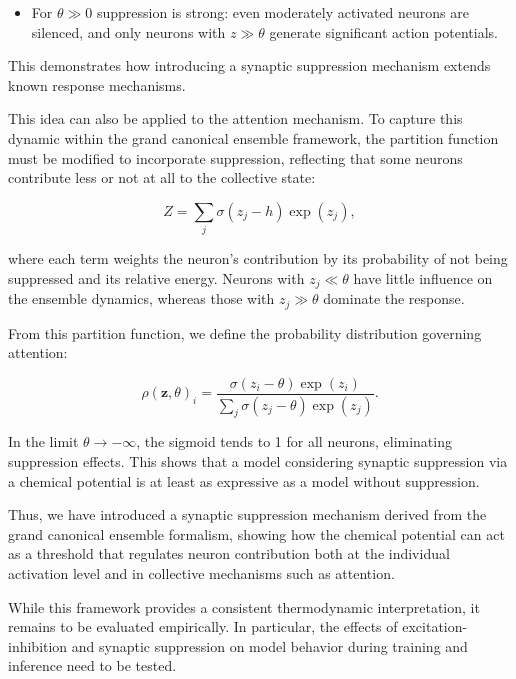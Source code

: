 \documentclass[12pt]{article}
\begin{document}
\begin{itemize}
\item For $\theta \gg 0$ suppression is strong: even moderately activated neurons are silenced, and only neurons with $z \gg \theta$ generate significant action potentials.
\end{itemize}

This demonstrates how introducing a synaptic suppression mechanism extends known response mechanisms.

This idea can also be applied to the attention mechanism. To capture this dynamic within the grand canonical ensemble framework, the partition function must be modified to incorporate suppression, reflecting that some neurons contribute less or not at all to the collective state:

\begin{equation}
Z = \sum_j \sigma(z_j-h) \exp(z_j),
\end{equation}

where each term weights the neuron’s contribution by its probability of not being suppressed and its relative energy. Neurons with $z_j \ll \theta$ have little influence on the ensemble dynamics, whereas those with $z_j \gg \theta$ dominate the response.

From this partition function, we define the probability distribution governing attention:

\begin{equation}
\rho(\mathbf{z}, \theta)_i =\frac{ \sigma(z_i- \theta) \exp(z_i)}{\sum_j \sigma(z_j-\theta) \exp(z_j)}.
\end{equation}

In the limit $\theta \to -\infty$, the sigmoid tends to 1 for all neurons, eliminating suppression effects. This shows that a model considering synaptic suppression via a chemical potential is at least as expressive as a model without suppression.

Thus, we have introduced a synaptic suppression mechanism derived from the grand canonical ensemble formalism, showing how the chemical potential can act as a threshold that regulates neuron contribution both at the individual activation level and in collective mechanisms such as attention.

While this framework provides a consistent thermodynamic interpretation, it remains to be evaluated empirically. In particular, the effects of excitation-inhibition and synaptic suppression on model behavior during training and inference need to be tested.
\end{document}
